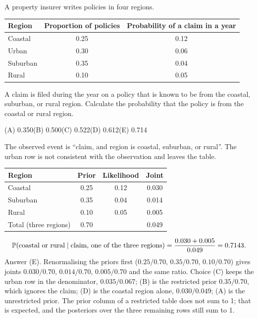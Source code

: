 \begin{example}
A property insurer writes policies in four regions.
\begin{center}
\begin{tabular}{@{}lcc@{}}
\toprule
Region & Proportion of policies & Probability of a claim in a year \\
\midrule
Coastal  & 0.25 & 0.12 \\
Urban    & 0.30 & 0.06 \\
Suburban & 0.35 & 0.04 \\
Rural    & 0.10 & 0.05 \\
\bottomrule
\end{tabular}
\end{center}
A claim is filed during the year on a policy that is known to be from the coastal, suburban,
or rural region. Calculate the probability that the policy is from the coastal or rural
region.
\par\smallskip\noindent (A) 0.350\qquad (B) 0.500\qquad (C) 0.522\qquad (D) 0.612\qquad (E) 0.714
\end{example}
\begin{solution}
The observed event is ``claim, and region is coastal, suburban, or rural''. The urban row is
not consistent with the observation and leaves the table.
\begin{center}
\begin{tabular}{@{}lccc@{}}
\toprule
Region & Prior & Likelihood & Joint \\
\midrule
Coastal  & 0.25 & 0.12 & 0.030 \\
Suburban & 0.35 & 0.04 & 0.014 \\
Rural    & 0.10 & 0.05 & 0.005 \\
\midrule
Total (three regions) & 0.70 & & 0.049 \\
\bottomrule
\end{tabular}
\end{center}
\[
\mathbb{P}(\text{coastal or rural} \mid \text{claim, one of the three regions})
= \frac{0.030 + 0.005}{0.049} = 0.7143.
\]
Answer (E). Renormalising the priors first ($0.25/0.70$, $0.35/0.70$, $0.10/0.70$) gives
joints $0.030/0.70$, $0.014/0.70$, $0.005/0.70$ and the same ratio. Choice (C) keeps the
urban row in the denominator, $0.035/0.067$; (B) is the restricted prior $0.35/0.70$, which
ignores the claim; (D) is the coastal region alone, $0.030/0.049$; (A) is the unrestricted
prior. The prior column of a restricted table does not sum to 1; that is expected, and the
posteriors over the three remaining rows still sum to 1.
\end{solution}

